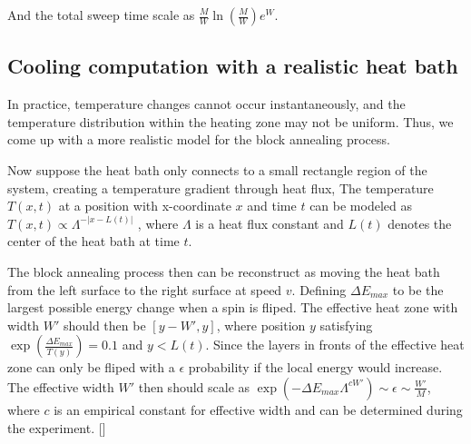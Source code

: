 \documentclass[twocolumn,superscriptaddress,english,showpacs,longbibliography]{revtex4-2}
\newcommand{\ym}[1]{[{\color{red}{YM: #1}}]}
\begin{document}
And the total sweep time scale as $\frac{M}{W}\ln(\frac{M}{W})e^W$.




\subsection{Cooling computation with a realistic heat bath}\label{estimation-of-the-computing-time}

In practice, temperature changes cannot occur instantaneously, and the temperature distribution within the heating zone may not be uniform.
Thus, we come up with a more realistic model for the block annealing process.

Now suppose the heat bath only connects to a small rectangle region of the system, creating a temperature gradient through heat flux,
The temperature $T(x, t)$  at a position with x-coordinate  $x$  and time  $t$  can be modeled as  $T(x, t) \propto \Lambda^{-|x - L(t)|}$ , 
where $\Lambda$ is a heat flux constant and $L(t)$ denotes the center of the heat bath at time $t$.

The block annealing process then can be reconstruct as moving
the heat bath from the left surface to the right surface at speed $v$. Defining $\Delta E_{max}$ to be the
largest possible energy change when a spin is fliped.
The effective heat zone with width $W'$ should then be $[y-W', y]$, where position $y$ satisfying 
$\exp(\frac{\Delta E_{max}}{T(y)}) = 0.1$ and $y<L(t)$. Since the layers
in fronts of the effective heat zone can only be fliped with a $\epsilon$ probability if the local energy would increase. 
The effective width $W'$ then should scale as $\exp(-\Delta E_{max} \Lambda^{cW'}) \sim \epsilon \sim \frac{W'}{M}$, where $c$ is an empirical constant for effective width and can be determined during the experiment. 
\ym{I am not sure about how to give a concrete definition of the effective width $W'$.}
\end{document}
